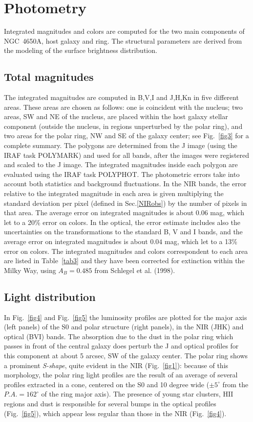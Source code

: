 \documentclass[preprint]{aastex}
\begin{document}
\section{Photometry}\label{photo}
Integrated magnitudes and colors are computed for
the two main components of NGC~4650A, host galaxy and ring. 
The structural parameters are derived from the modeling of
the surface brightness distribution. 

\subsection{Total magnitudes}\label{colors}
The integrated magnitudes are computed in B,V,I and J,H,Kn in five different areas. 
These areas are chosen as follows:
one is coincident with the nucleus; two areas, SW and NE of the nucleus, 
are placed within the host galaxy stellar component (outside the nucleus, 
in regions unperturbed by the polar ring),
and two areas for the polar ring, NW and SE of the galaxy center; 
see Fig.~\ref{fig3} for a complete summary.
The polygons are determined from the J image (using
the IRAF task POLYMARK) and used for all bands, 
after the images were registered and scaled to the J
image.
The integrated magnitudes inside each polygon are evaluated using the IRAF
task POLYPHOT. The photometric errors take into account both
statistics and background fluctuations. In the NIR bands, the error
relative to the integrated magnitude in each area is given 
multiplying the standard deviation per pixel (defined in Sec.\ref{NIRobs})
by the number of pixels in that area. The average error on integrated
magnitudes is about $0.06$ mag, which let to a 20\% error on colors. 
In the optical,
the error estimate includes also the uncertainties on the 
transformations to the standard B, V and I bands, and the average error 
on integrated magnitudes is about $0.04$ mag, which let to a 13\% 
error on colors.
The integrated magnitudes and colors correspondent to 
each area are listed in Table~\ref{tab3} and they have been corrected 
for extinction within the Milky Way, using
$A_{B}=0.485$ from Schlegel et al. (1998).


\subsection{Light distribution}\label{profiles}
In Fig.~\ref{fig4} and Fig.~\ref{fig5} the luminosity profiles are plotted 
for the major axis (left panels) of the S0 and polar structure 
(right panels), in the NIR (JHK) and optical (BVI) bands. 
The absorption due to the dust in the polar ring which passes in front of 
the central galaxy does perturb the J and optical profiles for this component 
at about 5 arcsec, SW of the galaxy center.
The polar ring shows a prominent {\it S-shape}, quite evident
in the NIR (Fig.~\ref{fig1}):  
because of this morphology, the polar ring light profiles 
are the result of an average of several profiles
extracted in a cone, centered on the S0 and 10 degree
wide ($\pm 5^{\circ}$ from the $P.A.=162^\circ$ of the ring major axis).
The presence of young star clusters, HII regions and dust is responsible 
for several bumps in the optical profiles (Fig.~\ref{fig5}), 
which appear less regular than those in the NIR (Fig.~\ref{fig4}). 
\end{document}
